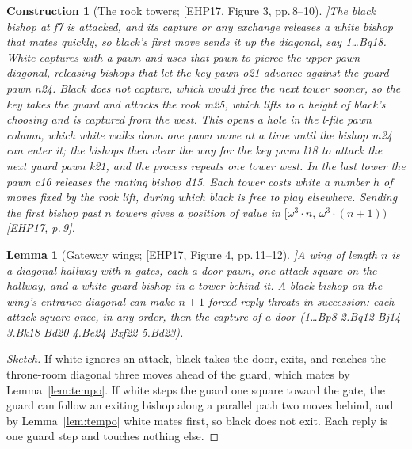 \documentclass[10pt]{article}
\theoremstyle{notes}
\newtheorem{lemma}[theorem]{Lemma}
\newtheorem{construction}[theorem]{Construction}
\newenvironment{sketch}{\begin{proof}[Sketch]\renewcommand{\qedsymbol}{}}{\end{proof}}
\newcommand{\EHP}[1]{[EHP17, #1]}
\begin{document}
\begin{construction}[The rook towers; \EHP{Figure 3, pp.\,8--10}]\label{con:towers}
The black bishop at f7 is attacked, and its capture or any exchange releases a white bishop that mates
quickly, so black's first move sends it up the diagonal, say 1\ldots Bq18. White captures with a pawn and
uses that pawn to pierce the upper pawn diagonal, releasing bishops that let the key pawn o21 advance against
the guard pawn n24. Black does not capture, which would free the next tower sooner, so the key takes the
guard and attacks the rook m25, which lifts to a height of black's choosing and is captured from the west.
This opens a hole in the l-file pawn column, which white walks down one pawn move at a time until the bishop
m24 can enter it; the bishops then clear the way for the key pawn l18 to attack the next guard pawn k21, and
the process repeats one tower west. In the last tower the pawn c16 releases the mating bishop d15. Each
tower costs white a number $h$ of moves fixed by the rook lift, during which black is free to play elsewhere.
Sending the first bishop past $n$ towers gives a position of value in $[\omega^3\cdot n,\,\omega^3\cdot(n+1))$
\EHP{p.\,9}.
\end{construction}

\begin{lemma}[Gateway wings; \EHP{Figure 4, pp.\,11--12}]\label{lem:wing}
A wing of length $n$ is a diagonal hallway with $n$ gates, each a door pawn, one attack square on the hallway,
and a white guard bishop in a tower behind it. A black bishop on the wing's entrance diagonal can make $n+1$
forced-reply threats in succession: each attack square once, in any order, then the capture of a door
(1\ldots Bp8 2.Bq12 Bj14 3.Bk18 Bd20 4.Be24 Bxf22 5.Bd23).
\end{lemma}

\begin{sketch}
If white ignores an attack, black takes the door, exits, and reaches the throne-room diagonal three moves
ahead of the guard, which mates by Lemma~\ref{lem:tempo}. If white steps the guard one square toward the
gate, the guard can follow an exiting bishop along a parallel path two moves behind, and by
Lemma~\ref{lem:tempo} white mates first, so black does not exit. Each reply is one guard step and touches
nothing else.
\end{sketch}
\end{document}
